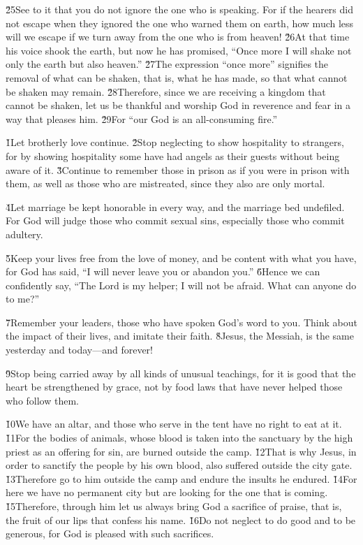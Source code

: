 \v{25}See to it that you do not ignore the one who is speaking. For if the hearers did not escape when they ignored the one who warned them on earth, how much less will we escape if we turn away from the one who is from heaven! \v{26}At that time his voice shook the earth, but now he has promised, ``Once more I will shake not only the earth but also heaven.'' \v{27}The expression ``once more'' signifies the removal of what can be shaken, that is, what he has made, so that what cannot be shaken may remain. \v{28}Therefore, since we are receiving a kingdom that cannot be shaken, let us be thankful and worship God in reverence and fear in a way that pleases him. \v{29}For ``our God is an all-consuming fire.''

\v{1}Let brotherly love continue. \v{2}Stop neglecting to show hospitality to strangers, for by showing hospitality some have had angels as their guests without being aware of it. \v{3}Continue to remember those in prison as if you were in prison with them, as well as those who are mistreated, since they also are only mortal.

\v{4}Let marriage be kept honorable in every way, and the marriage bed undefiled. For God will judge those who commit sexual sins, especially those who commit adultery.

\v{5}Keep your lives free from the love of money, and be content with what you have, for God has said, ``I will never leave you or abandon you.'' \v{6}Hence we can confidently say, ``The Lord is my helper; I will not be afraid. What can anyone do to me?''

\v{7}Remember your leaders, those who have spoken God's word to you. Think about the impact of their lives, and imitate their faith. \v{8}Jesus, the Messiah, is the same yesterday and today---and forever!

\v{9}Stop being carried away by all kinds of unusual teachings, for it is good that the heart be strengthened by grace, not by food laws that have never helped those who follow them.

\v{10}We have an altar, and those who serve in the tent have no right to eat at it. \v{11}For the bodies of animals, whose blood is taken into the sanctuary by the high priest as an offering for sin, are burned outside the camp. \v{12}That is why Jesus, in order to sanctify the people by his own blood, also suffered outside the city gate. \v{13}Therefore go to him outside the camp and endure the insults he endured. \v{14}For here we have no permanent city but are looking for the one that is coming. \v{15}Therefore, through him let us always bring God a sacrifice of praise, that is, the fruit of our lips that confess his name. \v{16}Do not neglect to do good and to be generous, for God is pleased with such sacrifices.

